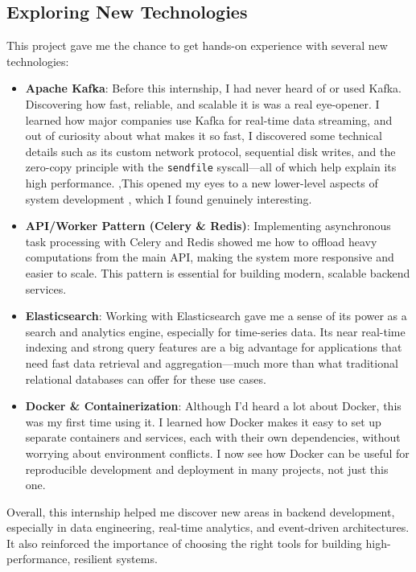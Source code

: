 \subsection{Exploring New Technologies}
This project gave me the chance to get hands-on experience with several new technologies:
\begin{itemize}
    \item \textbf{Apache Kafka}: Before this internship, I had never heard of or used Kafka. Discovering how fast, reliable, and scalable it is was a real eye-opener. I learned how major companies use Kafka for real-time data streaming, and out of curiosity about what makes it so fast, I discovered some technical details such as its custom network protocol, sequential disk writes, and the zero-copy principle with the \texttt{sendfile} syscall—all of which help explain its high performance. ,This  opened my eyes to a  new lower-level aspects of system development , which I found genuinely interesting.
    \item \textbf{API/Worker Pattern (Celery \& Redis)}: Implementing asynchronous task processing with Celery and Redis showed me how to offload heavy computations from the main API, making the system more responsive and easier to scale. This pattern is essential for building modern, scalable backend services.
    \item \textbf{Elasticsearch}: Working with Elasticsearch gave me a sense of its power as a search and analytics engine, especially for time-series data. Its near real-time indexing and strong query features are a big advantage for applications that need fast data retrieval and aggregation—much more than what traditional relational databases can offer for these use cases.
    \item \textbf{Docker \& Containerization}: Although I’d heard a lot about Docker, this was my first time using it. I learned how Docker makes it easy to set up separate containers and services, each with their own dependencies, without worrying about environment conflicts. I now see how Docker can be useful for reproducible development and deployment in many projects, not just this one.
\end{itemize}
Overall, this internship helped me discover new areas in backend development, especially in data engineering, real-time analytics, and event-driven architectures. It also reinforced the importance of choosing the right tools for building high-performance, resilient systems.
